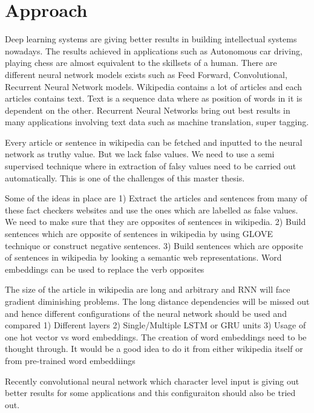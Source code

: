 \documentclass[a4paper, 11pt]{article}
\begin{document}
\section{Approach}

Deep learning systems are giving better results in building intellectual systems nowadays.\cite{Goldberg2016} The results achieved in applications such as Autonomous car driving, playing chess are almost equivalent to the skillsets of a human. There are different neural network models exists such as Feed Forward, Convolutional, Recurrent Neural Network models. Wikipedia contains a lot of articles and each articles contains text. Text is a sequence data where as position of words in it is dependent on the other. Recurrent Neural Networks bring out best results in many applications involving text data such as machine translation, super tagging.

Every article or sentence in wikipedia can be fetched and inputted to the neural network as truthy value. But we lack false values. We need to use a semi supervised technique where in extraction of falsy values need to be carried out automatically. This is one of the challenges of this master thesis. 

Some of the ideas in place are
1) Extract the articles and sentences from many of these fact checkers websites and use the ones which are labelled as false values. We need to make sure that they are opposites of sentences in wikipedia.
2) Build sentences which are opposite of sentences in wikipedia by using GLOVE technique or construct negative sentences. 
3) Build sentences which are opposite of sentences in wikipedia by looking a semantic web representations. Word embeddings can be used to replace the verb opposites 

The size of the article in wikipedia are long and arbitrary and RNN will face gradient diminishing problems. The long distance dependencies will be missed out and hence different configurations of the neural network should be used and compared 
1) Different layers
2) Single/Multiple LSTM or GRU units
3) Usage of one hot vector vs word embeddings. The creation of word embeddings need to be thought through. It would be a good idea to do it from either wikipedia itself or from pre-trained word embeddiings


Recently convolutional neural network which character level input is giving out better results for some applications and this configuraiton should also be tried out.
\end{document}
